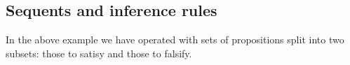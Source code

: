 \subsection{Sequents and inference rules}
In the above example we have operated with sets of propositions split into two subsets: those to satisy and those to falsify.